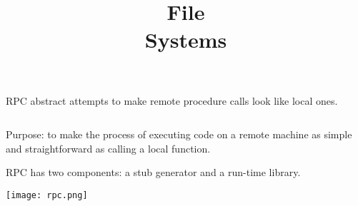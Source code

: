 

\title{File\\Systems}



\begin{frame}
    \titlepage
\end{frame}

\begin{slide}


    RPC abstract attempts to make remote procedure calls look like local ones.

\end{slide}

\begin{slide}


    \inputminted[fontsize=\scriptsize]{c}{wmsg.c}

\end{slide}

\begin{slide}


    Purpose: to make the process of executing code on a remote machine as simple and straightforward as calling a local function.
    \bigskip

    RPC has two components: a stub generator and a run-time library.
    \bigskip

    \texttt{[image: rpc.png]}

\end{slide}

\begin{slide}


    \inputminted{python}{Adder.idl}

\end{slide}

\begin{slide}


    \inputminted{python}{server.py}
    \bigskip

    \inputminted{python}{client.py}

\end{slide}

